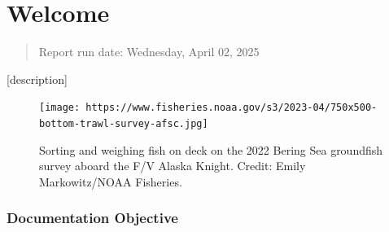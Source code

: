 \documentclass[
  letterpaper,
  oneside,
  open=any]{scrbook}
\renewcommand*\contentsname{Table of contents}
\newcommand\contentsname{Table of contents}
\begin{document}
\begin{frontmatter}
\begin{titlepage}
\begin{minipage}[b][\textheight][s]{\minipagewidth}
\titleblock

\authorblock

\affiliationblock

\vfill

\logoblock

\footerblock
\par

\end{minipage}
\clearpage
\restoregeometry
\end{titlepage}
\setcounter{page}{1}
\end{frontmatter}


\renewcommand*\contentsname{Table of contents}
{
\setcounter{tocdepth}{1}
\tableofcontents
}
\listoffigures
\listoftables
\mainmatter
\part{Welcome}

\begin{quote}
Report run date: Wednesday, April 02, 2025
\end{quote}

{[}description{]}

\begin{figure}

{\centering \texttt{[image: https://www.fisheries.noaa.gov/s3/2023-04/750x500-bottom-trawl-survey-afsc.jpg]}

}

\caption{Sorting and weighing fish on deck on the 2022 Bering Sea
groundfish survey aboard the F/V Alaska Knight. Credit: Emily
Markowitz/NOAA Fisheries.}

\end{figure}

\hypertarget{documentation-objective}{%
\section*{Documentation Objective}\label{documentation-objective}}
\end{document}
